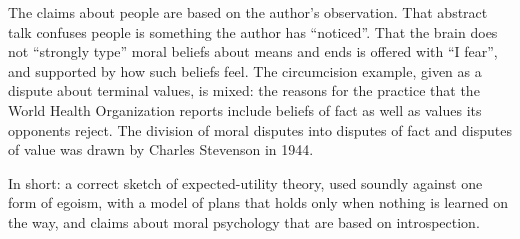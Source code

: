 \begin{afterword}
The claims about people are based on the author's observation. That abstract talk confuses people is something the author has ``noticed''. That the brain does not ``strongly type'' moral beliefs about means and ends is offered with ``I fear'', and supported by how such beliefs feel. The circumcision example, given as a dispute about terminal values, is mixed: the reasons for the practice that the World Health Organization reports include beliefs of fact as well as values its opponents reject. The division of moral disputes into disputes of fact and disputes of value was drawn by Charles Stevenson in 1944.

In short: a correct sketch of expected-utility theory, used soundly against one form of egoism, with a model of plans that holds only when nothing is learned on the way, and claims about moral psychology that are based on introspection.
\end{afterword}
